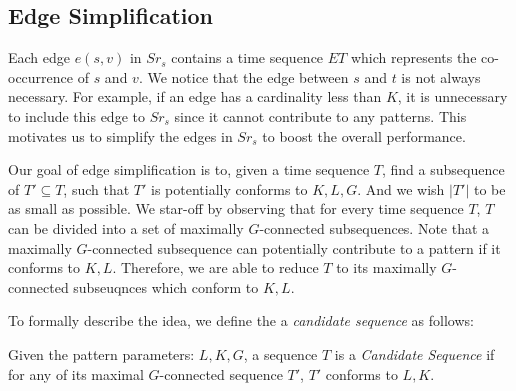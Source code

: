 \subsection{Edge Simplification}
Each edge $e(s,v)$ in $Sr_s$ contains a time sequence $ET$ 
which represents the co-occurrence of $s$ and $v$. We notice that the edge 
between $s$ and $t$ is not always necessary. For example, if an edge has a
cardinality less than $K$, it is unnecessary to include this edge to 
$Sr_s$ since it cannot contribute to any patterns.
This motivates us to simplify the edges in $Sr_s$ 
to boost the overall performance.

Our goal of edge simplification is to, given a time sequence $T$, find a subsequence
of $T' \subseteq T$, such that $T'$ is potentially conforms to $K,L,G$. And we
wish $|T'|$ to be as small as possible.  
We star-off by observing that for every time sequence $T$, $T$ can be 
divided into a set of maximally $G$-connected subsequences. Note that
a maximally $G$-connected subsequence can potentially contribute to
a pattern if it conforms to $K,L$.
Therefore, we are able to reduce $T$
to its maximally $G$-connected subseuqnces which conform to $K,L$.

To formally describe the idea, we define the a \emph{candidate sequence} as follows:


%

\begin{definition}
Given the pattern parameters: $L,K,G$, a sequence $T$ is a \emph{Candidate Sequence} 
if for any of its maximal $G$-connected sequence $T'$, $T'$ conforms to $L,K$.
\end{definition}

